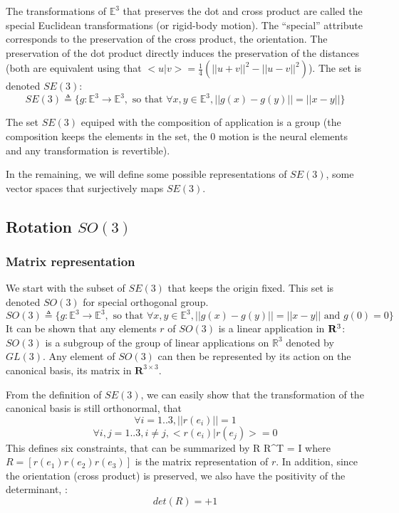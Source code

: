 \documentclass{book}
\begin{document}
The transformations of $\mathbb{E}^3$ that preserves the dot and cross product are called the special Euclidean transformations (or rigid-body motion). The ``special'' attribute corresponds to the preservation of the cross product, \mie the orientation. The preservation of the dot product directly induces the preservation of the distances (both are equivalent using that $<u|v> = \frac{1}{4} ( ||u+v||^2 - ||u-v||^2)$). The set is denoted $SE(3)$:
\[ SE(3) \triangleq \Big\{ g : \mathbb{E}^3 \rightarrow \mathbb{E}^3, \textrm{ so that } \forall x,y \in \mathbb{E}^3, || g(x) - g(y) || = ||x - y|| \Big\} \]

The set $SE(3)$ equiped with the composition of application is a group (\mie the composition keeps the elements in the set, the 0 motion is the neural elements and any transformation is revertible). 

In the remaining, we will define some possible representations of $SE(3)$, \mie some vector spaces that surjectively maps $SE(3)$.


\subsection{Rotation $SO(3)$}

\subsubsection{Matrix representation}
We start with the subset of $SE(3)$ that keeps the origin fixed. This set is denoted $SO(3)$ for special orthogonal group. 
\[ SO(3) \triangleq \Big\{ g : \mathbb{E}^3 \rightarrow \mathbb{E}^3, \textrm{ so that } \forall x,y \in \mathbb{E}^3, || g(x) - g(y) || = ||x - y|| \textrm{ and } g(0) = 0 \Big\} \]
It can be shown that any elements $r$ of $SO(3)$ is a linear application in $\mathbf{R}^3$: $SO(3)$ is a subgroup of the group of linear applications on $\mathbb{R}^3$ denoted by $GL(3)$. Any element of $SO(3)$ can then be represented by its action on the canonical basis, \mie its matrix in $\mathbf{R}^{3\times 3}$.

From the definition of $SE(3)$, we can easily show that the transformation of the canonical basis is still orthonormal, \mie that
\[ \forall i = 1..3, || r(e_i) || = 1 \]
\[ \forall i,j=1..3, i \neq j,  <r(e_i)|r(e_j)> = 0 \]
This defines six constraints, that can be summarized by 
 R R^T = I \EOUT
where $R = [ r(e_1) r(e_2) r(e_3) ]$ is the matrix representation of $r$. In addition, since the orientation (cross product) is preserved, we also have the positivity of the determinant, \mie:
\[ det(R) = +1\]
\end{document}
